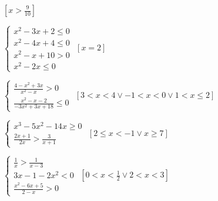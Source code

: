 \begin{esercizio}[\Ast]
\begin{enumeratea}
 \hfill \(\left[x>\frac{9}{10}\right]\)
\item \(\left\{\begin{array}{l}
           x^2-3x+2\le 0\\
           x^2-4x+4\le 0\\
           x^2-x+10>0\\
           x^2-2x\le 0 \end{array}\right.\)
 \hfill \(\left[x=2\right]\)
\item \(\left\{\begin{array}{l}
           \frac{4-x^2+3x}{x^2-x}>0 \\
           \frac{x^2-x-2}{-3x^2+3x+18} \le 0 \end{array}\right.\)
 \hfill \(\left[3<x<4\vee -1<x<0\vee 1<x\le 2\right]\)
\item \(\left\{\begin{array}{l}
           x^3-5x^2-14x\ge 0 \\ 
           \frac{2x+1}{2x} > \frac 3{x+1}\end{array}\right.\)
 \hfill \(\left[2\le x<-1\vee x\ge 7\right]\)
\item \(\left\{\begin{array}{l}
           \frac 1 x>\frac 1{x-3}\\3x-1-2x^2<0\\
           \frac{x^2-6x+5}{2-x}>0 \end{array}\right.\)
 \hfill \(\left[0<x<\frac 1 2\vee 2<x<3\right]\)
 \end{enumeratea}
\end{esercizio}

